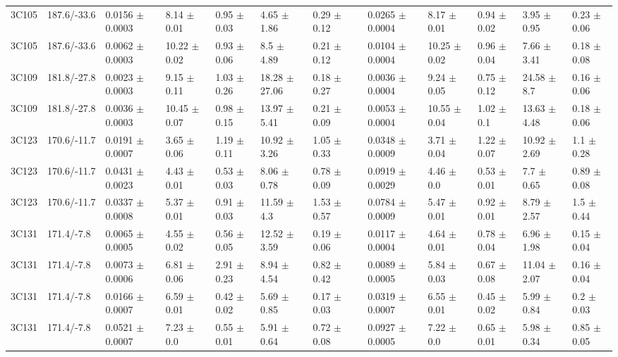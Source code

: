 \documentclass[preprint]{emulateapj}
\begin{document}
\begin{table}
\begin{tabular}{ lllllllclllll  }
3C105 & 187.6/-33.6 & 0.0156 $\pm$ 0.0003 & 8.14 $\pm$ 0.01 & 0.95 $\pm$ 0.03 & 4.65 $\pm$ 1.86 & 0.29 $\pm$ 0.12 & &  0.0265 $\pm$ 0.0004 & 8.17 $\pm$ 0.01 & 0.94 $\pm$ 0.02 & 3.95 $\pm$ 0.95 & 0.23 $\pm$ 0.06 \\
3C105 & 187.6/-33.6 & 0.0062 $\pm$ 0.0003 & 10.22 $\pm$ 0.02 & 0.93 $\pm$ 0.06 & 8.5 $\pm$ 4.89 & 0.21 $\pm$ 0.12 & &  0.0104 $\pm$ 0.0004 & 10.25 $\pm$ 0.02 & 0.96 $\pm$ 0.04 & 7.66 $\pm$ 3.41 & 0.18 $\pm$ 0.08 \\
3C109 & 181.8/-27.8 & 0.0023 $\pm$ 0.0003 & 9.15 $\pm$ 0.11 & 1.03 $\pm$ 0.26 & 18.28 $\pm$ 27.06 & 0.18 $\pm$ 0.27 & &  0.0036 $\pm$ 0.0004 & 9.24 $\pm$ 0.05 & 0.75 $\pm$ 0.12 & 24.58 $\pm$ 8.7 & 0.16 $\pm$ 0.06 \\
3C109 & 181.8/-27.8 & 0.0036 $\pm$ 0.0003 & 10.45 $\pm$ 0.07 & 0.98 $\pm$ 0.15 & 13.97 $\pm$ 5.41 & 0.21 $\pm$ 0.09 & &  0.0053 $\pm$ 0.0004 & 10.55 $\pm$ 0.04 & 1.02 $\pm$ 0.1 & 13.63 $\pm$ 4.48 & 0.18 $\pm$ 0.06 \\
3C123 & 170.6/-11.7 & 0.0191 $\pm$ 0.0007 & 3.65 $\pm$ 0.06 & 1.19 $\pm$ 0.11 & 10.92 $\pm$ 3.26 & 1.05 $\pm$ 0.33 & &  0.0348 $\pm$ 0.0009 & 3.71 $\pm$ 0.04 & 1.22 $\pm$ 0.07 & 10.92 $\pm$ 2.69 & 1.1 $\pm$ 0.28 \\
3C123 & 170.6/-11.7 & 0.0431 $\pm$ 0.0023 & 4.43 $\pm$ 0.01 & 0.53 $\pm$ 0.03 & 8.06 $\pm$ 0.78 & 0.78 $\pm$ 0.09 & &  0.0919 $\pm$ 0.0029 & 4.46 $\pm$ 0.0 & 0.53 $\pm$ 0.01 & 7.7 $\pm$ 0.65 & 0.89 $\pm$ 0.08 \\
3C123 & 170.6/-11.7 & 0.0337 $\pm$ 0.0008 & 5.37 $\pm$ 0.01 & 0.91 $\pm$ 0.03 & 11.59 $\pm$ 4.3 & 1.53 $\pm$ 0.57 & &  0.0784 $\pm$ 0.0009 & 5.47 $\pm$ 0.01 & 0.92 $\pm$ 0.01 & 8.79 $\pm$ 2.57 & 1.5 $\pm$ 0.44 \\
3C131 & 171.4/-7.8 & 0.0065 $\pm$ 0.0005 & 4.55 $\pm$ 0.02 & 0.56 $\pm$ 0.05 & 12.52 $\pm$ 3.59 & 0.19 $\pm$ 0.06 & &  0.0117 $\pm$ 0.0004 & 4.64 $\pm$ 0.01 & 0.78 $\pm$ 0.04 & 6.96 $\pm$ 1.98 & 0.15 $\pm$ 0.04 \\
3C131 & 171.4/-7.8 & 0.0073 $\pm$ 0.0006 & 6.81 $\pm$ 0.06 & 2.91 $\pm$ 0.23 & 8.94 $\pm$ 4.54 & 0.82 $\pm$ 0.42 & &  0.0089 $\pm$ 0.0005 & 5.84 $\pm$ 0.03 & 0.67 $\pm$ 0.08 & 11.04 $\pm$ 2.07 & 0.16 $\pm$ 0.04 \\
3C131 & 171.4/-7.8 & 0.0166 $\pm$ 0.0007 & 6.59 $\pm$ 0.01 & 0.42 $\pm$ 0.02 & 5.69 $\pm$ 0.85 & 0.17 $\pm$ 0.03 & &  0.0319 $\pm$ 0.0007 & 6.55 $\pm$ 0.01 & 0.45 $\pm$ 0.02 & 5.99 $\pm$ 0.84 & 0.2 $\pm$ 0.03 \\
3C131 & 171.4/-7.8 & 0.0521 $\pm$ 0.0007 & 7.23 $\pm$ 0.0 & 0.55 $\pm$ 0.01 & 5.91 $\pm$ 0.64 & 0.72 $\pm$ 0.08 & &  0.0927 $\pm$ 0.0005 & 7.22 $\pm$ 0.0 & 0.65 $\pm$ 0.01 & 5.98 $\pm$ 0.34 & 0.85 $\pm$ 0.05 \\

\end{tabular}
\end{table}
\end{document}
